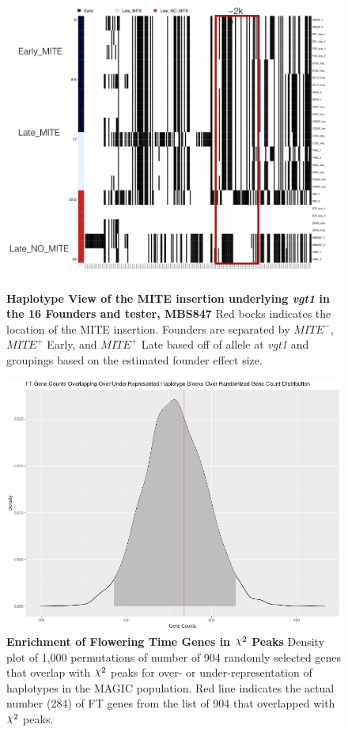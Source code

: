 \documentclass[article,9pt,twocolumn,twoside]{rilabRxiv}
\DeclareRobustCommand{\rchi}{{\mathpalette\irchi\relax}}
\newcommand{\irchi}[2]{\raisebox{\depth}{$#1\chi$}} %
\begin{document}
\begin{figure}[ht]
\centering
\includegraphics[width=16cm,height=10cm]{figures/mite_founder_haps.png}
\caption{\textbf{Haplotype View of the MITE insertion underlying \emph{vgt1} in the 16 Founders and tester, MBS847} Red bocks indicates the location of the MITE insertion. Founders are separated by $MITE^-$, $MITE^+$ Early, and $MITE^+$ Late based off of allele at \emph{vgt1} and groupings based on the estimated founder effect size.}
\label{fig:supfigure14}
\end{figure}

\begin{figure}[ht]
\centering
\includegraphics[width=\linewidth]{figures/ft_overlap_enrichment_density.png}
\caption{\textbf{Enrichment of Flowering Time Genes in $\rchi^2$ Peaks} Density plot of 1,000 permutations of number of 904 randomly selected genes that overlap with $\rchi^2$ peaks for over- or under-representation of haplotypes in the MAGIC population. Red line indicates the actual number (284) of FT genes from the list of 904 that overlapped with $\rchi^2$ peaks.}
\label{fig:supfigure4}
\end{figure}
\end{document}
